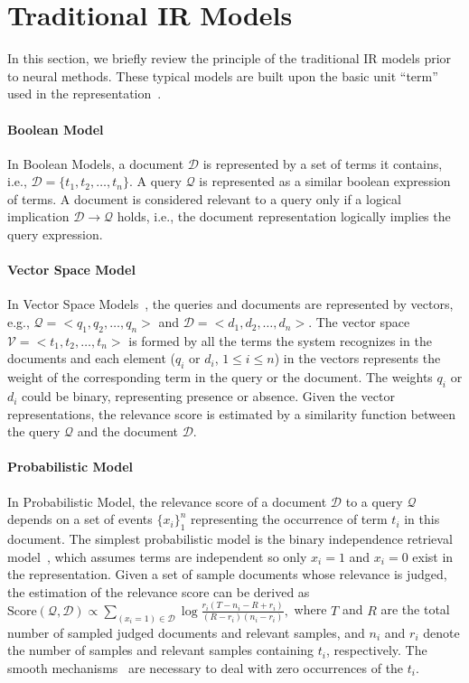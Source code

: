 \section{Traditional IR Models}%
\label{sec:traditional}
In this section, we briefly review the principle of the traditional IR models prior to neural methods. These typical models are built upon the basic unit ``term'' used in the representation~\cite{nie2010cross}.

\paragraph{Boolean Model}
In Boolean Models, a document $\mathcal{D}$ is represented by a set of terms it contains, i.e., $\mathcal{D}=\{t_1, t_2, \dots, t_n\}$. A query $\mathcal{Q}$ is represented as a similar boolean expression of terms. 
A document is considered relevant to a query only if a logical implication $\mathcal{D} \rightarrow \mathcal{Q}$ holds, i.e., the document representation logically implies the query expression. 

\paragraph{Vector Space Model}
In Vector Space Models~\cite{salton1975vector}, the queries and documents are represented by vectors, e.g., $\mathcal{Q}=<q_1, q_2, \dots, q_n>$ and $\mathcal{D} = <d_1, d_2, \dots, d_n>$. 
The vector space $\mathcal{V} = <t_1, t_2, \dots, t_n>$ is formed by all the terms the system recognizes in the documents and each element ($q_i$ or $d_i$, $1 \leq i \leq  n$) in the vectors represents the weight of the corresponding term in the query or the document. 
The weights $q_i$ or $d_i$ could be binary, representing presence or absence. 
Given the vector representations, the relevance score is estimated by a similarity function between the query $\mathcal{Q}$ and the document $\mathcal{D}$.  

\paragraph{Probabilistic Model}
In Probabilistic Model, the relevance score of a document $\mathcal{D}$ to a query $\mathcal{Q}$ depends on a set of events $\{x_i\}_1^{n}$ representing the occurrence of term $t_i$ in this document. 
The simplest probabilistic model is the binary independence retrieval model~\cite{robertson1976relevance}, which assumes terms are independent so only $x_i=1$ and $x_i=0$ exist in the representation. 
Given a set of sample documents whose relevance is judged, the estimation of the relevance score can be derived as 
$\text{Score}(\mathcal{Q},\mathcal{D}) \propto \sum_{(x_i=1)\in\mathcal{D}} \log \frac{r_i(T-n_i-R+r_i)}{(R-r_i)(n_i-r_i)}, $
where $T$ and $R$ are the total number of sampled judged documents and relevant samples, and $n_i$ and $r_i$ denote the number of samples and relevant samples containing $t_i$, respectively.
The smooth mechanisms~\cite{baeza1999modern} are necessary to deal with zero occurrences of the $t_i$.

